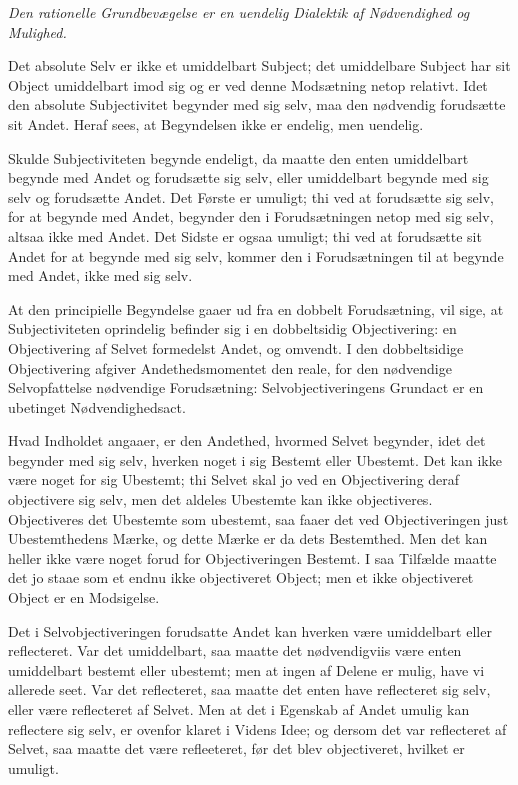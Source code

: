 \documentclass[12pt]{book}
\newcommand{\opage}[1]{\marginnote{\footnotesize\textit{[#1]}}}
\begin{document}
\emph{Den rationelle Grundbevægelse er en uendelig Dialektik af
Nødvendighed og Mulighed.}

Det absolute Selv er ikke et umiddelbart Subject; det umiddelbare
Subject har sit Object umiddelbart imod sig og er ved denne
Modsætning netop relativt. Idet den absolute Subjectivitet begynder
med sig selv, maa den nødvendig forudsætte sit Andet. Heraf sees, at
Begyndelsen ikke er endelig, men uendelig.

Skulde Subjectiviteten begynde endeligt, da maatte den enten
umiddelbart begynde med Andet og forudsætte sig selv, eller
umiddelbart begynde med sig selv og forudsætte Andet. Det Første er
umuligt; thi ved at forudsætte sig selv, for at begynde med Andet,
begynder den i Forudsætningen netop med sig selv, altsaa ikke med
Andet. Det Sidste er ogsaa umuligt; thi ved at forudsætte sit Andet
for at begynde med sig selv, kommer den i Forudsætningen til at
begynde med Andet, ikke med sig selv.

\opage{79} At den principielle Begyndelse gaaer ud fra en dobbelt Forudsætning,
vil sige, at Subjectiviteten oprindelig befinder sig i en
dobbeltsidig Objectivering: en Objectivering af Selvet formedelst
Andet, og omvendt. I den dobbeltsidige Objectivering afgiver
Andethedsmomentet den reale, for den nødvendige Selvopfattelse
nødvendige Forudsætning: Selvobjectiveringens Grundact er en
ubetinget Nødvendighedsact.

Hvad Indholdet angaaer, er den Andethed, hvormed Selvet begynder,
idet det begynder med sig selv, hverken noget i sig Bestemt eller
Ubestemt. Det kan ikke være noget for sig Ubestemt; thi Selvet skal
jo ved en Objectivering deraf objectivere sig selv, men det aldeles
Ubestemte kan ikke objectiveres. Objectiveres det Ubestemte som
ubestemt, saa faaer det ved Objectiveringen just Ubestemthedens
Mærke, og dette Mærke er da dets Bestemthed. Men det kan heller ikke
være noget forud for Objectiveringen Bestemt. I saa Tilfælde maatte
det jo staae som et endnu ikke objectiveret Object; men et ikke
objectiveret Object er en Modsigelse.

Det i Selvobjectiveringen forudsatte Andet kan hverken være
umiddelbart eller reflecteret. Var det umiddelbart, saa maatte det
nødvendigviis være enten umiddelbart bestemt eller ubestemt; men at
ingen af Delene er mulig, have vi allerede seet. Var det reflecteret,
saa maatte det enten have reflecteret sig selv, eller være
reflecteret af Selvet. Men at det i Egenskab af Andet umulig kan
reflectere sig selv, er ovenfor klaret i Videns Idee; og dersom det
var reflecteret af Selvet, saa maatte det være refleeteret, før det
blev objectiveret, hvilket er umuligt.
\end{document}
